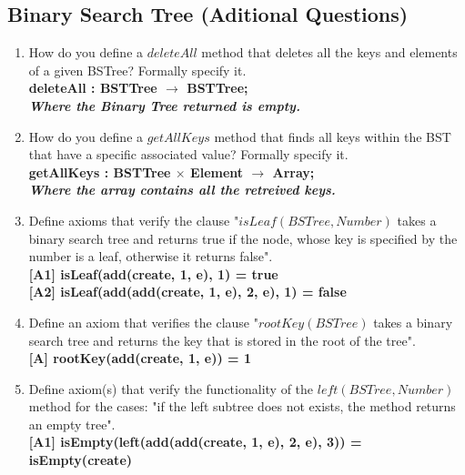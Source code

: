 \documentclass[12pt]{article}
\begin{document}
\begin{spacing}{1.5}
\section*{Binary Search Tree (Aditional Questions)}

\begin{enumerate}

\item How do you define a $deleteAll$ method that deletes all the keys and elements of a given BSTree? Formally specify it.\\
\textbf{deleteAll : BSTTree $\rightarrow$ BSTTree; \\ \textit{Where the Binary Tree returned is empty.}}

\item How do you define a $getAllKeys$ method that finds all keys within the BST that have a specific associated value? Formally specify it.\\
\textbf{getAllKeys : BSTTree $\times$ Element $\rightarrow$ Array; \\ \textit{Where the array contains all the retreived keys.}}

\item Define axioms that verify the clause "$isLeaf(BSTree, Number)$ takes a binary search tree and returns true if the node, whose key is specified by the number is a leaf, otherwise it returns false".\\
\hspace*{5mm} \textbf{[A1] isLeaf(add(create, 1, e), 1) = true}\\
\hspace*{5mm} \textbf{[A2] isLeaf(add(add(create, 1, e), 2, e), 1) = false}

\item Define an axiom that verifies the clause "$rootKey(BSTree)$ takes a binary search tree and returns the key that is stored in the root of the tree".\\
\hspace*{5mm} \textbf{[A] rootKey(add(create, 1, e)) = 1}\\

\item Define axiom(s) that verify the functionality of the $left(BSTree, Number)$ method for the cases: "if the left subtree does not exists, the method returns an empty tree".\\
\hspace*{5mm} \textbf{[A1] isEmpty(left(add(add(create, 1, e), 2, e), 3)) = isEmpty(create)}


\end{enumerate}
\end{spacing}
\end{document}
